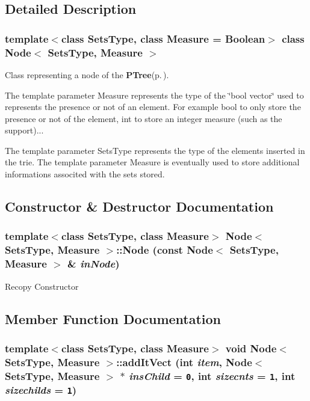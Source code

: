 \subsection{Detailed Description}
\subsubsection*{template$<$class Sets\-Type, class Measure = Boolean$>$ class Node$<$ Sets\-Type, Measure $>$}

Class representing a node of the {\bf PTree}{\rm (p.\,\pageref{class_p_tree})}. 

The template parameter Measure represents the type of the \char`\"{}bool vector\char`\"{} used to represents the presence or not of an element. For example bool to only store the presence or not of the element, int to store an integer measure (such as the support)...

The template parameter Sets\-Type represents the type of the elements inserted in the trie. The template parameter Measure is eventually used to store additional informations associted with the sets stored. 



\subsection{Constructor \& Destructor Documentation}
\subsubsection{\setlength{\rightskip}{0pt plus 5cm}template$<$class Sets\-Type, class Measure$>$ {\bf Node}$<$ Sets\-Type, Measure $>$::{\bf Node} (const {\bf Node}$<$ Sets\-Type, Measure $>$ \& {\em in\-Node})}\label{class_node_796ed77ffb6aa900993ce9b4a9700c1d}


Recopy Constructor 

\subsection{Member Function Documentation}
\subsubsection{\setlength{\rightskip}{0pt plus 5cm}template$<$class Sets\-Type, class Measure$>$ void {\bf Node}$<$ Sets\-Type, Measure $>$::add\-It\-Vect (int {\em item}, {\bf Node}$<$ Sets\-Type, Measure $>$ $\ast$ {\em ins\-Child} = {\tt 0}, int {\em sizecnts} = {\tt 1}, int {\em sizechilds} = {\tt 1})}\label{class_node_e5ee3b6e405b43d3358288f5c8e521c1}


